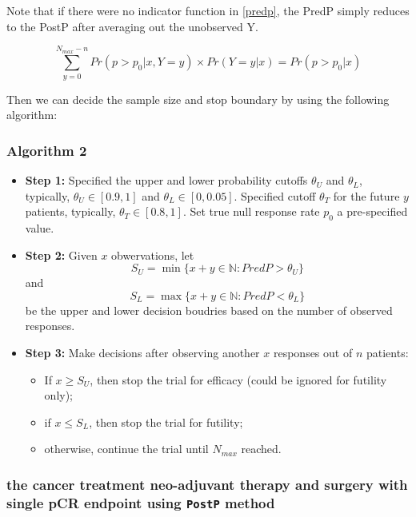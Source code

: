 \documentclass[]{article}
\providecommand{\tightlist}{%
  \setlength{\itemsep}{0pt}\setlength{\parskip}{0pt}}
\begin{document}
Note that if there were no indicator function in \ref{predp}, the PredP
simply reduces to the PostP after averaging out the unobserved Y.

\[\sum\limits_{y=0}^{N_{max} -n}  Pr(p>p_0|x, Y=y) \times Pr(Y=y|x) = Pr(p>p_0|x)\]

Then we can decide the sample size and stop boundary by using the
following algorithm:

\subsubsection{Algorithm 2}\label{algorithm-2}

\begin{itemize}
\tightlist
\item
  \textbf{Step 1:} Specified the upper and lower probability cutoffs
  \(\theta_U\) and \(\theta_L\), typically, \(\theta_U \in [0.9,1]\) and
  \(\theta_L \in [0,0.05]\). Specified cutoff \(\theta_T\) for the
  future \(y\) patients, typically, \(\theta_T \in [0.8,1]\). Set true
  null response rate \(p_0\) a pre-specified value.
\item
  \textbf{Step 2:} Given \(x\) obwervations, let
  \[S_U =\min \{x+y \in \mathbb{N}:  PredP > \theta_U \}\] and
  \[ S_L =\max \{x+y \in \mathbb{N}:  PredP < \theta_L \}\] be the upper
  and lower decision boudries based on the number of observed responses.
\item
  \textbf{Step 3:} Make decisions after observing another \(x\)
  responses out of \(n\) patients:

  \begin{itemize}
  \tightlist
  \item
    If \(x \ge S_U\), then stop the trial for efficacy (could be ignored
    for futility only);
  \item
    if \(x \le S_L\), then stop the trial for futility;
  \item
    otherwise, continue the trial until \(N_{max}\) reached.
  \end{itemize}
\end{itemize}

\subsubsection{\texorpdfstring{the cancer treatment neo-adjuvant therapy
and surgery with single pCR endpoint using \texttt{PostP}
method}{the cancer treatment neo-adjuvant therapy and surgery with single pCR endpoint using PostP method}}\label{the-cancer-treatment-neo-adjuvant-therapy-and-surgery-with-single-pcr-endpoint-using-postp-method-1}
\end{document}
